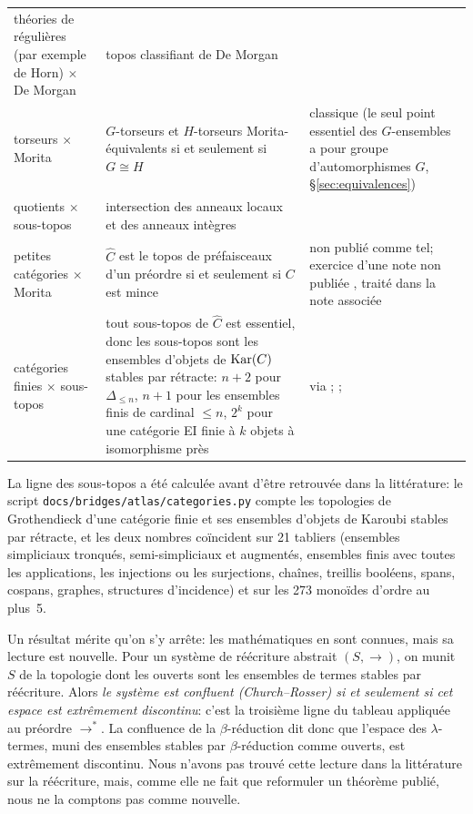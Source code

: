 \begin{center}
\begin{tabularx}{\linewidth}{>{\raggedright\arraybackslash}p{4.3cm}>{\raggedright\arraybackslash}X>{\raggedright\arraybackslash}p{3.3cm}}
théories de régulières (par exemple de Horn) $\times$ De Morgan & topos classifiant de De Morgan & \cite[Th.~3.5]{caramello-demorgan}\\
torseurs $\times$ Morita & $G$-torseurs et $H$-torseurs Morita-équivalents si et seulement si $G\cong H$ & classique (le seul point essentiel des $G$-ensembles a pour groupe d'automorphismes $G$, \S\ref{sec:equivalences})\\
quotients $\times$ sous-topos & intersection des anneaux locaux et des anneaux intègres & \cite[\S18]{caramello-lattices}\\
petites catégories $\times$ Morita & $\widehat C$ est le topos de préfaisceaux d'un préordre si et seulement si $C$ est mince & non publié comme tel; exercice d'une note non publiée \cite[p.~26]{grothendieck-161-3}, traité dans la note associée \cite{bridges-notes}\\
catégories finies $\times$ sous-topos & tout sous-topos de $\widehat C$ est essentiel, donc les sous-topos sont les ensembles d'objets de $\operatorname{Kar}(C)$ stables par rétracte: $n+2$ pour $\Delta_{\le n}$, $n+1$ pour les ensembles finis de cardinal $\le n$, $2^{k}$ pour une catégorie EI finie à $k$ objets à isomorphisme près & \cite[IV, ex.~9.1.12]{sga4} via \cite[Prop.~4.1]{wu-xu}; \cite{kelly-lawvere}; \cite[Cor.~3.3, ex.~6.3--6.4]{menni}\\
\bottomrule
\end{tabularx}
\end{center}

La ligne des sous-topos a été calculée avant d'être retrouvée dans la littérature: le script \nolinkurl{docs/bridges/atlas/categories.py} compte les topologies de Grothendieck d'une catégorie finie et ses ensembles d'objets de Karoubi stables par rétracte, et les deux nombres coïncident sur 21 tabliers (ensembles simpliciaux tronqués, semi-simpliciaux et augmentés, ensembles finis avec toutes les applications, les injections ou les surjections, chaînes, treillis booléens, spans, cospans, graphes, structures d'incidence) et sur les 273 monoïdes d'ordre au plus~5.

Un résultat mérite qu'on s'y arrête: les mathématiques en sont connues, mais sa lecture est nouvelle. Pour un système de réécriture abstrait $(S,\to)$, on munit $S$ de la topologie dont les ouverts sont les ensembles de termes stables par réécriture. Alors \emph{le système est confluent (Church--Rosser) si et seulement si cet espace est extrêmement discontinu}: c'est la troisième ligne du tableau appliquée au préordre $\to^*$. La confluence de la $\beta$-réduction dit donc que l'espace des $\lambda$-termes, muni des ensembles stables par $\beta$-réduction comme ouverts, est extrêmement discontinu. Nous n'avons pas trouvé cette lecture dans la littérature sur la réécriture, mais, comme elle ne fait que reformuler un théorème publié, nous ne la comptons pas comme nouvelle.
